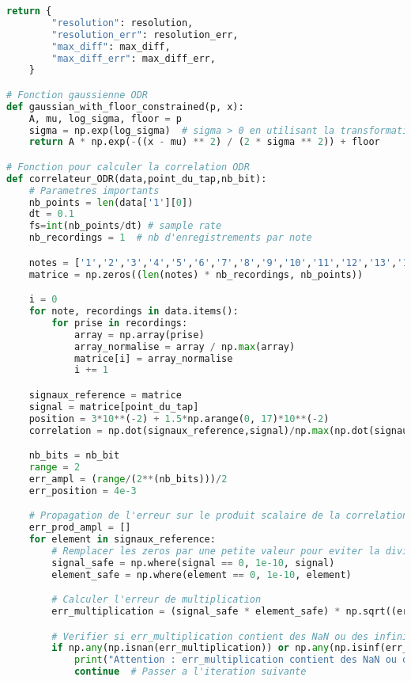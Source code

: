 \documentclass[11pt,letterpaper]{article}
\begin{document}
\begin{lstlisting}[language=python]
    return {
        "resolution": resolution,
        "resolution_err": resolution_err,
        "max_diff": max_diff,
        "max_diff_err": max_diff_err,
    }

# Fonction gaussienne ODR
def gaussian_with_floor_constrained(p, x):
    A, mu, log_sigma, floor = p
    sigma = np.exp(log_sigma)  # sigma > 0 en utilisant la transformation exponentielle
    return A * np.exp(-((x - mu) ** 2) / (2 * sigma ** 2)) + floor

# Fonction pour calculer la correlation ODR
def correlateur_ODR(data,point_du_tap,nb_bit):
    # Parametres importants
    nb_points = len(data['1'][0])  
    dt = 0.1
    fs=int(nb_points/dt) # sample rate
    nb_recordings = 1  # nb d'enregistrements par note

    notes = ['1','2','3','4','5','6','7','8','9','10','11','12','13','14','15','16','17']
    matrice = np.zeros((len(notes) * nb_recordings, nb_points))

    i = 0
    for note, recordings in data.items():
        for prise in recordings:
            array = np.array(prise)
            array_normalise = array / np.max(array)
            matrice[i] = array_normalise
            i += 1

    signaux_reference = matrice
    signal = matrice[point_du_tap]
    position = 3*10**(-2) + 1.5*np.arange(0, 17)*10**(-2)
    correlation = np.dot(signaux_reference,signal)/np.max(np.dot(signaux_reference,signal))

    nb_bits = nb_bit
    range = 2
    err_ampl = (range/(2**(nb_bits)))/2
    err_position = 4e-3

    # Propagation de l'erreur sur le produit scalaire de la correlation
    err_prod_ampl = []
    for element in signaux_reference:
        # Remplacer les zeros par une petite valeur pour eviter la division par zero
        signal_safe = np.where(signal == 0, 1e-10, signal)
        element_safe = np.where(element == 0, 1e-10, element)

        # Calculer l'erreur de multiplication
        err_multiplication = (signal_safe * element_safe) * np.sqrt((err_ampl / signal_safe) ** 2 + (err_ampl / element_safe) ** 2)

        # Verifier si err_multiplication contient des NaN ou des infinis
        if np.any(np.isnan(err_multiplication)) or np.any(np.isinf(err_multiplication)):
            print("Attention : err_multiplication contient des NaN ou des infinis.")
            continue  # Passer a l'iteration suivante


\end{lstlisting}
\end{document}
